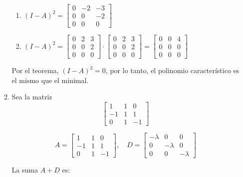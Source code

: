 \documentclass{report}
\begin{document}
\begin{enumerate}
\begin{enumerate}
            \begin{enumerate}
                \item $(I-A)^{2} = \begin{bmatrix} 0 & -2 & -3 \\ 0 & 0 & -2 \\ 0 & 0 & 0 \end{bmatrix}$
                \item $(I-A)^{2} = \begin{bmatrix} 0 & 2 & 3 \\ 0 & 0 & 2 \\ 0 & 0 & 0 \end{bmatrix} \cdot \begin{bmatrix} 0 & 2 & 3 \\ 0 & 0 & 2 \\ 0 & 0 & 0 \end{bmatrix} = \begin{bmatrix} 0 & 0 & 4 \\ 0 & 0 & 0 \\ 0 & 0 & 0 \end{bmatrix}$
            \end{enumerate}

            Por el teorema, $(I-A)^{3} = 0$, por lo tanto, el polinomio característico es el mismo que el minimal.

            \item Sea la matriz $$\begin{bmatrix}
                1 & 1 & 0\\
                -1 & 1 & 1\\
                0 & 1 & -1
            \end{bmatrix}$$

            \[
                A = \begin{bmatrix}
                1 & 1 & 0 \\
                -1 & 1 & 1 \\
                0 & 1 & -1
                \end{bmatrix}, \quad
                D = \begin{bmatrix}
                -\lambda & 0 & 0 \\
                0 & -\lambda & 0 \\
                0 & 0 & -\lambda
                \end{bmatrix}
                \]
                
                La suma $A + D$ es:
                

\end{enumerate}
\end{enumerate}
\end{document}
